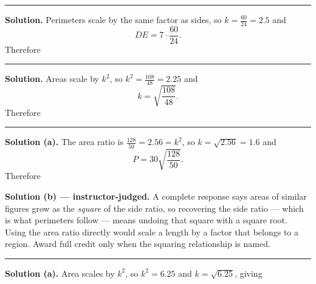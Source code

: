 \documentclass[12pt]{article}
\begin{document}
\vspace{0.15cm}\noindent\rule{\linewidth}{0.2pt}


\noindent\textbf{Solution.} Perimeters scale by the same factor as sides, so
$k = \frac{60}{24} = 2.5$ and
\[ DE = 7 \cdot \frac{60}{24} . \]
Therefore 

\vspace{0.15cm}\noindent\rule{\linewidth}{0.2pt}


\noindent\textbf{Solution.} Areas scale by $k^2$, so
$k^2 = \frac{108}{48} = 2.25$ and
\[ k = \sqrt{\frac{108}{48}} . \]
Therefore 

\vspace{0.15cm}\noindent\rule{\linewidth}{0.2pt}


\noindent\textbf{Solution (a).} The area ratio is
$\frac{128}{50} = 2.56 = k^2$, so $k = \sqrt{2.56} = 1.6$ and
\[ P = 30 \sqrt{\frac{128}{50}} . \]
Therefore 

\noindent\textbf{Solution (b) --- instructor-judged.} A complete response says
areas of similar figures grow as the \emph{square} of the side ratio, so
recovering the side ratio --- which is what perimeters follow --- means undoing
that square with a square root. Using the area ratio directly would scale a
length by a factor that belongs to a region. Award full credit only when the
squaring relationship is named.

\vspace{0.15cm}\noindent\rule{\linewidth}{0.2pt}


\noindent\textbf{Solution (a).} Area scales by $k^2$, so $k^2 = 6.25$ and
$k = \sqrt{6.25}$, giving 
\end{document}
